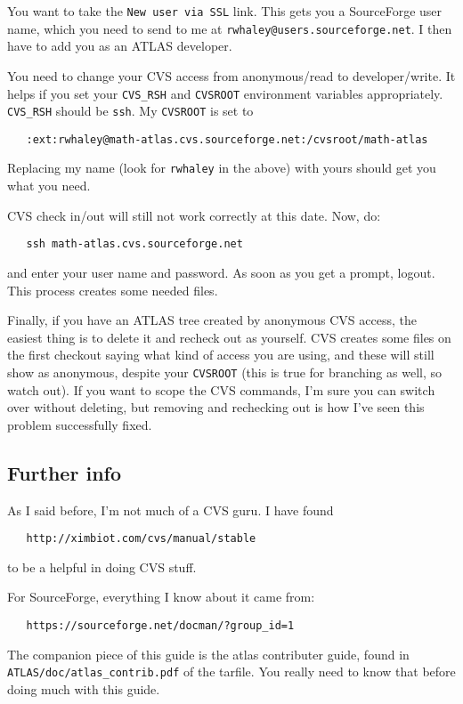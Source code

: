 \documentclass[11pt]{article}
\begin{document}
You want to take the {\tt New user via SSL} link.
This gets you a SourceForge user name, which you need to send to me at
{\tt rwhaley@users.sourceforge.net}.  I then have to add you as an ATLAS
developer.

You need to change your CVS access from anonymous/read to developer/write.
It helps if you set your {\tt CVS\_RSH} and {\tt CVSROOT} environment variables
appropriately.  {\tt CVS\_RSH} should be {\tt ssh}.  My {\tt CVSROOT} is
set to 
\begin{verbatim}
   :ext:rwhaley@math-atlas.cvs.sourceforge.net:/cvsroot/math-atlas
\end{verbatim}
Replacing my name (look for {\tt rwhaley} in the above) with yours should
get you what you need.

CVS check in/out will still not work correctly at this date.  Now, do:

\begin{verbatim}
   ssh math-atlas.cvs.sourceforge.net
\end{verbatim}
and enter your user name and
password.  As soon as you get a prompt, logout.  This process creates some 
needed files.

Finally, if you have an ATLAS tree created by anonymous CVS access, the
easiest thing is to delete it and recheck out as yourself.  CVS creates
some files on the first checkout saying what kind of access you are using,
and these will still show as anonymous, despite your {\tt CVSROOT} (this is
true for branching as well, so watch out).  If you
want to scope the CVS commands, I'm sure you can switch over without deleting,
but removing and rechecking out is how I've seen this problem successfully
fixed.

\subsection{Further info}
As I said before, I'm not much of a CVS guru.  I have found 
\begin{verbatim}
   http://ximbiot.com/cvs/manual/stable
\end{verbatim}
to be a helpful in doing CVS stuff.

For SourceForge, everything I know about it came from:
\begin{verbatim}
   https://sourceforge.net/docman/?group_id=1
\end{verbatim}

The companion piece of this guide is the atlas contributer guide, found
in {\tt ATLAS/doc/atlas\_contrib.pdf} of the tarfile.  You really need to 
know that before doing much with this guide.
\end{document}
